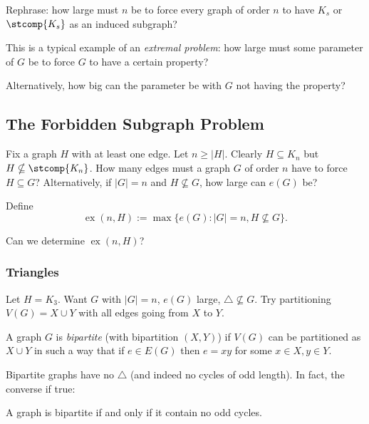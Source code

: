 \documentclass[a4paper]{article}
\DeclareMathOperator{\exx}{ex} %
\begin{document}
Rephrase: how large must \(n\) be to force every graph of order \(n\) to have \(K_s\) or \(\stcomp{K_s}\) as an induced subgraph?

This is a typical example of an \emph{extremal problem}: how large must some parameter of \(G\) be to force \(G\) to have a certain property?

Alternatively, how big can the parameter be with \(G\) not having the property?

\subsection{The Forbidden Subgraph Problem}

Fix a graph \(H\) with at least one edge. Let \(n \geq |H|\). Clearly \(H \subseteq K_n\) but \(H \nsubseteq \stcomp{K_n}\). How many edges must a graph \(G\) of order \(n\) have to force \(H \subseteq G\)? Alternatively, if \(|G| = n\) and \(H \nsubseteq G\), how large can \(e(G)\) be?

\begin{definition}
  Define
  \[
    \exx(n,H) := \max\{ e(G): |G|=n, H \nsubseteq G\}.
  \]
\end{definition}

\begin{question}
  Can we determine \(\exx(n,H)\)?
\end{question}

\subsubsection{Triangles}

Let \(H = K_3\). Want \(G\) with \(|G| = n\), \(e(G)\) large, \(\triangle \nsubseteq G\). Try partitioning \(V(G) = X\cup Y\) with all edges going from \(X\) to \(Y\).

\begin{definition}
  A graph \(G\) is \emph{bipartite} (with bipartition \((X,Y)\)) if \(V(G)\) can be partitioned as \(X\cup Y\) in such a way that if \(e\in E(G)\) then \(e=xy\) for some \(x\in X, y\in Y\).
\end{definition}

Bipartite graphs have no \(\triangle\) (and indeed no cycles of odd length). In fact, the converse if true:

\begin{theorem}
  A graph is bipartite if and only if it contain no odd cycles.
\end{theorem}
\end{document}
